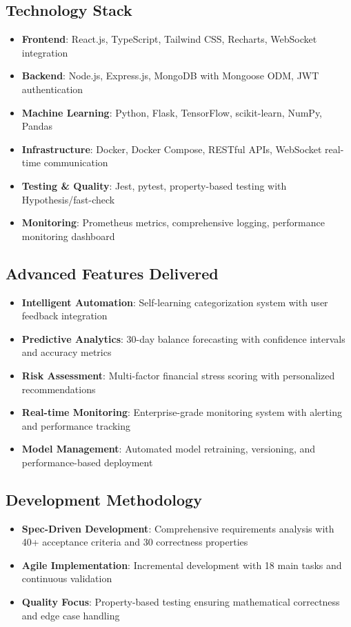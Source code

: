 \documentclass[11pt]{article}
\begin{document}
\subsection*{Technology Stack}
\begin{itemize}[leftmargin=*]
    \item \textbf{Frontend}: React.js, TypeScript, Tailwind CSS, Recharts, WebSocket integration
    \item \textbf{Backend}: Node.js, Express.js, MongoDB with Mongoose ODM, JWT authentication
    \item \textbf{Machine Learning}: Python, Flask, TensorFlow, scikit-learn, NumPy, Pandas
    \item \textbf{Infrastructure}: Docker, Docker Compose, RESTful APIs, WebSocket real-time communication
    \item \textbf{Testing \& Quality}: Jest, pytest, property-based testing with Hypothesis/fast-check
    \item \textbf{Monitoring}: Prometheus metrics, comprehensive logging, performance monitoring dashboard
\end{itemize}

\subsection*{Advanced Features Delivered}
\begin{itemize}[leftmargin=*]
    \item \textbf{Intelligent Automation}: Self-learning categorization system with user feedback integration
    \item \textbf{Predictive Analytics}: 30-day balance forecasting with confidence intervals and accuracy metrics
    \item \textbf{Risk Assessment}: Multi-factor financial stress scoring with personalized recommendations
    \item \textbf{Real-time Monitoring}: Enterprise-grade monitoring system with alerting and performance tracking
    \item \textbf{Model Management}: Automated model retraining, versioning, and performance-based deployment
\end{itemize}

\subsection*{Development Methodology}
\begin{itemize}[leftmargin=*]
    \item \textbf{Spec-Driven Development}: Comprehensive requirements analysis with 40+ acceptance criteria and 30 correctness properties
    \item \textbf{Agile Implementation}: Incremental development with 18 main tasks and continuous validation
    \item \textbf{Quality Focus}: Property-based testing ensuring mathematical correctness and edge case handling
\end{itemize}
\end{document}
